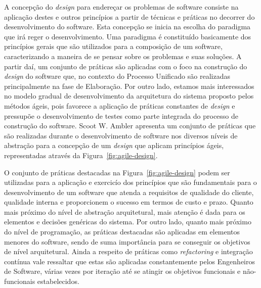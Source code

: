 %

A concepção do \emph{design} para endereçar os problemas de software consiste na aplicação destes e outros princípios a partir de técnicas e práticas no decorrer do desenvolvimento do software. Esta concepção se inicia na escolha do paradigma que irá reger o desenvolvimento. Uma paradigma é constituído basicamente dos princípios gerais que são utilizados para a composição de um software, caracterizando a maneira de se pensar sobre os problemas e suas soluções. A partir daí, um conjunto de práticas são aplicadas com o foco na construção do \emph{design} do software que, no contexto do Processo Unificado são realizadas principalmente na fase de Elaboração. Por outro lado, estamos mais interessados no modelo gradual de desenvolvimento da arquitetura do sistema proposto pelos métodos ágeis, pois favorece a aplicação de práticas constantes de \emph{design} e pressupõe o desenvolvimento de testes como parte integrada do processo de construção do software. Scoot W. Ambler apresenta um conjunto de práticas que são realizadas durante o desenvolvimento de software nos diversos níveis de abstração para a concepção de um \emph{design} que aplicam princípios ágeis, representadas através da Figura~\ref{fig:agile-design}.




%

O conjunto de práticas destacadas na Figura~\ref{fig:agile-design} podem ser utilizadas para a aplicação e exercicío dos princípios que são fundamentais para o desenvolvimento de um software que atenda a requisitos de qualidade do cliente, qualidade interna e proporcionem o sucesso em termos de custo e prazo. Quanto mais próximo do nível de abstração arquitetural, mais atenção é dada para os elementos e decisões genéricas do sistema. Por outro lado, quanto mais próximo do nível de programação, as práticas destacadas são aplicadas em elementos menores do software, sendo de suma importância para se conseguir os objetivos de nível arquitetural. Ainda a respeito de práticas como \emph{refactoring} e integração contínua vale ressaltar que estas são aplicadas constantemente pelos Engenheiros de Software, várias vezes por iteração até se atingir os objetivos funcionais e não-funcionais estabelecidos.

